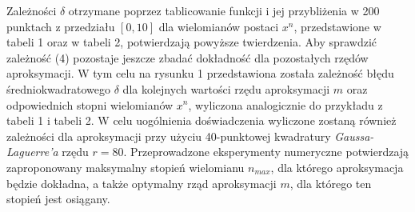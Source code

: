 \documentclass[a4paper,12pt]{article}
\begin{document}
Zależności $\delta$ otrzymane poprzez tablicowanie funkcji i jej przybliżenia w 200 punktach z przedziału $[0,10]$ dla wielomianów postaci $x^n$, przedstawione w tabeli 1 oraz w tabeli 2, potwierdzają powyższe twierdzenia. Aby sprawdzić zależność (4) pozostaje jeszcze zbadać dokładność dla pozostałych rzędów aproksymacji. W tym celu na rysunku 1 przedstawiona została zależność błędu średniokwadratowego $\delta$ dla kolejnych wartości rzędu aproksymacji $m$ oraz odpowiednich stopni wielomianów $x^n$, wyliczona analogicznie do przykładu z tabeli 1 i tabeli 2. W celu uogólnienia doświadczenia wyliczone zostaną również zależności dla aproksymacji przy użyciu 40-punktowej kwadratury \textit{Gaussa-Laguerre'a} rzędu $r = 80$. Przeprowadzone eksperymenty numeryczne potwierdzają zaproponowany maksymalny stopień wielomianu $n_{max}$, dla którego aproksymacja będzie dokładna, a także optymalny rząd aproksymacji $m$, dla którego ten stopień jest osiągany.
\end{document}
